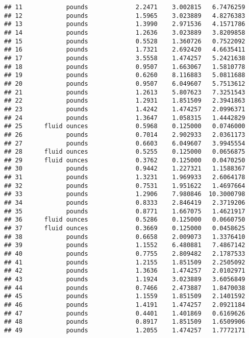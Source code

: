 \documentclass[
]{article}
\begin{document}
\begin{verbatim}
## 11            pounds             2.2471    3.002815   6.7476259
## 12            pounds             1.5965    3.023889   4.8276383
## 13            pounds             1.3990    2.971536   4.1571786
## 14            pounds             1.2636    3.023889   3.8209858
## 15            pounds             0.5528    1.360726   0.7522092
## 16            pounds             1.7321    2.692420   4.6635411
## 17            pounds             3.5558    1.474257   5.2421638
## 18            pounds             0.9507    1.663067   1.5810778
## 19            pounds             0.6260    8.116883   5.0811688
## 20            pounds             0.9507    6.049607   5.7513612
## 21            pounds             1.2613    5.807623   7.3251543
## 22            pounds             1.2931    1.851509   2.3941863
## 23            pounds             1.4242    1.474257   2.0996371
## 24            pounds             1.3647    1.058315   1.4442829
## 25      fluid ounces             0.5968    0.125000   0.0746000
## 26            pounds             0.7014    2.902933   2.0361173
## 27            pounds             0.6603    6.049607   3.9945554
## 28      fluid ounces             0.5255    0.125000   0.0656875
## 29      fluid ounces             0.3762    0.125000   0.0470250
## 30            pounds             0.9442    1.227321   1.1588367
## 31            pounds             1.3231    1.969933   2.6064178
## 32            pounds             0.7531    1.951622   1.4697664
## 33            pounds             1.2906    7.980846  10.3000798
## 34            pounds             0.8333    2.846419   2.3719206
## 35            pounds             0.8771    1.667075   1.4621917
## 36      fluid ounces             0.5286    0.125000   0.0660750
## 37      fluid ounces             0.3669    0.125000   0.0458625
## 38            pounds             0.6658    2.009073   1.3376410
## 39            pounds             1.1552    6.480881   7.4867142
## 40            pounds             0.7755    2.809482   2.1787533
## 41            pounds             1.2155    1.851509   2.2505092
## 42            pounds             1.3636    1.474257   2.0102971
## 43            pounds             1.1924    3.023889   3.6056849
## 44            pounds             0.7466    2.473887   1.8470038
## 45            pounds             1.1559    1.851509   2.1401592
## 46            pounds             1.4191    1.474257   2.0921184
## 47            pounds             0.4401    1.401869   0.6169626
## 48            pounds             0.8917    1.851509   1.6509906
## 49            pounds             1.2055    1.474257   1.7772171

\end{verbatim}
\end{document}

